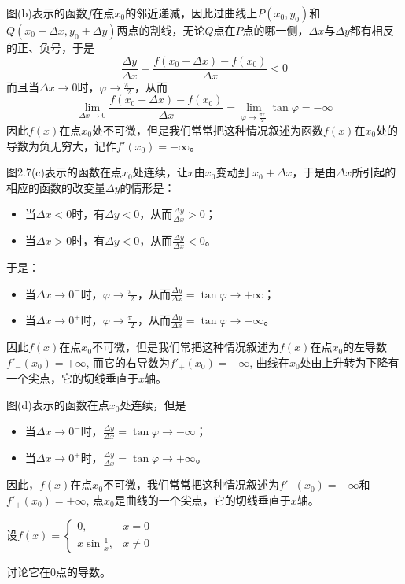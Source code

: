 图(b)表示的函数$f$在点$x_0$的邻近递减，因此过曲线上$P(x_0,y_0)$和$Q(x_0+\Delta x,y_0+\Delta y)$两点的割线，无论$Q$点在$P$点的哪一侧，$\Delta x$与$\Delta y$都有相反的正、负号，于是
\[\frac{\Delta y}{\Delta x}=\frac{f(x_0+\Delta x)-f(x_0)}{\Delta x}<0\]
而且当$\Delta x\to 0$时，$\varphi\to \frac{\pi^+}{2}$，从而
\[\lim_{\Delta x\to 0}\frac{f(x_0+\Delta x)-f(x_0)}{\Delta x}=\lim_{\varphi\to \tfrac{\pi^+}{2}}\tan\varphi=-\infty\]
因此$f(x)$在点$x_0$处不可微，但是我们常常把这种情况叙述为函数$f(x)$在$x_0$处的导数为负无穷大，记作$f'(x_0)=-\infty$。

图2.7(c)表示的函数在点$x_0$处连续，让$x$由$x_0$变动到
$x_0+\Delta x$，于是由$\Delta x$所引起的相应的函数的改变量$\Delta y$的情形是：
\begin{itemize}
    \item 当$\Delta x<0$时，有$\Delta y<0$，从而$\frac{\Delta y}{\Delta x}>0$；
    \item 当$\Delta x>0$时，有$\Delta y<  0$，从而$\frac{\Delta y}{\Delta x}<0$。
\end{itemize}
于是：
\begin{itemize}
    \item 当$\Delta x\to 0^-$时，$\varphi\to \frac{\pi^-}{2}$，从而$\frac{\Delta y}{\Delta x}=\tan\varphi\to +\infty$；
    \item 当$\Delta x\to 0^+$时，$\varphi\to \frac{\pi^+}{2}$，从而$\frac{\Delta y}{\Delta x}=\tan\varphi\to -\infty$。
\end{itemize}
因此$f(x)$在点$x_0$不可微，但是我们常把这种情况叙述为$f(x)$在点$x_0$的左导数$f'_-(x_0)=+\infty$, 而它的右导数为$f'_+(x_0)=-\infty$, 曲线在$x_0$处由上升转为下降有一个尖点，它的切线垂直于$x$轴。

图(d)表示的函数在点$x_0$处连续，但是
\begin{itemize}
    \item 当$\Delta x\to 0^-$时，$\frac{\Delta y}{\Delta x}=\tan\varphi\to -\infty$；
    \item 当$\Delta x\to 0^+$时，$\frac{\Delta y}{\Delta x}=\tan\varphi\to +\infty$。
\end{itemize}
因此，$f(x)$在点$x_0$不可微，我们常常把这种情况叙述为$f'_-(x_0)=-\infty$和$f'_+(x_0)=+\infty$, 点$x_0$是曲线的一个尖点，它的切线垂直于$x$轴。

\begin{example}
设$f(x)=\begin{cases}
    0,& x=0\\
    x\sin\frac{1}{x},& x\ne 0
\end{cases}$

讨论它在0点的导数。
\end{example}

